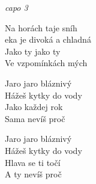 \re{}\textit{capo 3}

\cho{}
Na horách taje sníh\\
eka je divoká a chladná\\
Jako ty jako ty\\
Ve vzpomínkách mých

\ve{}
Jaro jaro bláznivý\\
Hážeš kytky do vody\\
Jako každej rok\\
Sama nevíš proč

\ve{}
Jaro jaro bláznivý\\
Hážeš kytky do vody\\
Hlava se ti točí\\
A ty nevíš proč

\cho{}

\esong{}